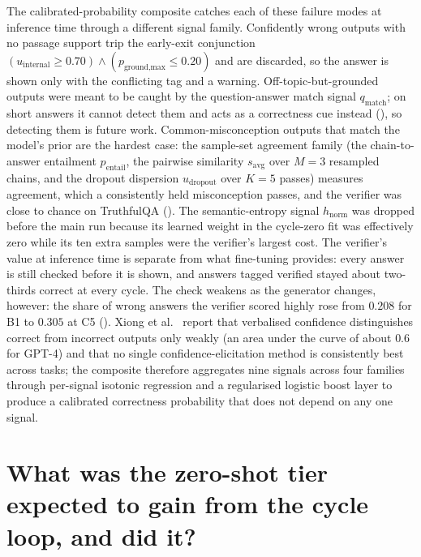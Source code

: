 The calibrated-probability composite catches each of these failure modes at inference time through a different signal family. Confidently wrong outputs with no passage support trip the early-exit conjunction $(u_{\text{internal}} \ge 0.70) \wedge\allowbreak (p_{\text{ground,max}} \le 0.20)$ and are discarded, so the answer is shown only with the conflicting tag and a warning. Off-topic-but-grounded outputs were meant to be caught by the question-answer match signal $q_{\text{match}}$; on short answers it cannot detect them and acts as a correctness cue instead (), so detecting them is future work. Common-misconception outputs that match the model's prior are the hardest case: the sample-set agreement family (the chain-to-answer entailment $p_{\text{entail}}$, the pairwise similarity $s_{\text{avg}}$ over $M=3$ resampled chains, and the dropout dispersion $u_{\text{dropout}}$ over $K=5$ passes) measures agreement, which a consistently held misconception passes, and the verifier was close to chance on TruthfulQA (). The semantic-entropy signal $h_{\text{norm}}$ was dropped before the main run because its learned weight in the cycle-zero fit was effectively zero while its ten extra samples were the verifier's largest cost. The verifier's value at inference time is separate from what fine-tuning provides: every answer is still checked before it is shown, and answers tagged verified stayed about two-thirds correct at every cycle. The check weakens as the generator changes, however: the share of wrong answers the verifier scored highly rose from $0.208$ for B1 to $0.305$ at C5 (). Xiong et al.~\cite{xiong2023can} report that verbalised confidence distinguishes correct from incorrect outputs only weakly (an area under the curve of about $0.6$ for GPT-4) and that no single confidence-elicitation method is consistently best across tasks; the composite therefore aggregates nine signals across four families through per-signal isotonic regression and a regularised logistic boost layer to produce a calibrated correctness probability that does not depend on any one signal.


\section[Tier-2 distillation]{What was the zero-shot tier expected to gain from the cycle loop, and did it?}
\label{app:qa-tier2-distillation}

